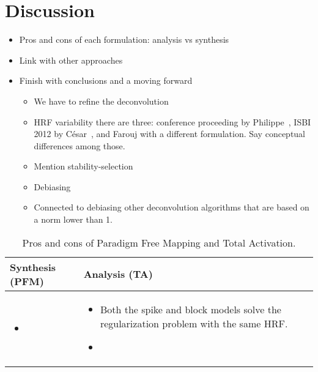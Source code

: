 \section{Discussion}

\newcommand\pro{\item[$+$]}
\newcommand\con{\item[$-$]}

\begin{itemize}
    \item Pros and cons of each formulation: analysis vs synthesis
    \item Link with other approaches
    \item Finish with conclusions and a moving forward
    \begin{itemize}
        \item We have to refine the deconvolution
        \item HRF variability there are three: conference proceeding by Philippe~\cite{badillo2013group}, ISBI 2012 by César~\cite{gaudes2012structured}, and Farouj with a different formulation. Say conceptual differences among those.
        \item Mention stability-selection~\cite{meinshausen2010stability}
        \item Debiasing
        \item Connected to debiasing other deconvolution algorithms that are based on a norm lower than 1.
    \end{itemize}
\end{itemize}

\begin{table}
    \centering
    \begin{tabular}{ m{4cm} m{4cm} }
        Synthesis (PFM) & Analysis (TA)\\
        \toprule
        \begin{itemize}
            \pro 
        \end{itemize} &
        \begin{itemize}
            \pro Both the spike and block models solve the regularization problem with the same HRF.
            \con 
        \end{itemize} \\
    \end{tabular}
    \caption{Pros and cons of Paradigm Free Mapping and Total Activation.}
\end{table}

